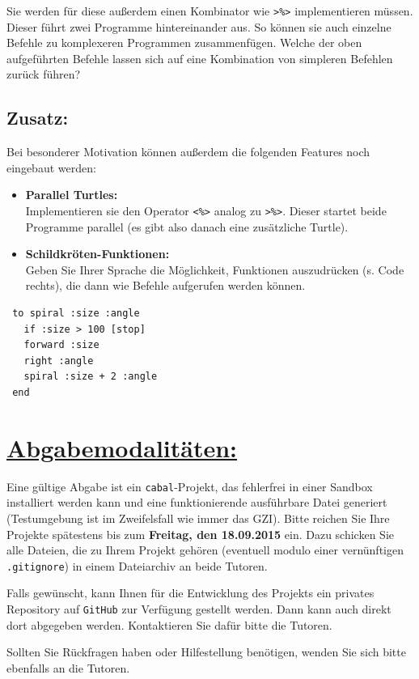 \documentclass[10pt,a4paper]{article}
\begin{document}
Sie werden für diese außerdem einen Kombinator wie \texttt{>\%>} implementieren müssen. Dieser führt zwei Programme hintereinander aus. So können sie auch einzelne Befehle zu
komplexeren Programmen zusammenfügen. Welche der oben aufgeführten Befehle lassen sich auf eine Kombination
von simpleren Befehlen zurück führen?

\subsection*{Zusatz:}

Bei besonderer Motivation können außerdem die folgenden Features noch eingebaut werden:\bigskip
 
\begin{minipage}{0.68\linewidth}
\begin{itemize}
\item \textbf{Parallel Turtles:}\\ Implementieren sie den Operator \texttt{<\%>} analog zu \texttt{>\%>}. Dieser startet beide Programme parallel (es gibt also danach eine zusätzliche Turtle).
\item \textbf{Schildkröten-Funktionen:}\\ Geben Sie Ihrer Sprache die Möglichkeit, Funktionen auszudrücken (s. Code rechts), die dann wie Befehle aufgerufen werden können.
\end{itemize}
\end{minipage}
\hfill
\begin{minipage}{0.3\linewidth}
\begin{verbatim}
 to spiral :size :angle
   if :size > 100 [stop]
   forward :size
   right :angle
   spiral :size + 2 :angle
 end
\end{verbatim}
\end{minipage}

\section*{\underline{Abgabemodalitäten:}}

Eine gültige Abgabe ist ein \texttt{cabal}-Projekt, das fehlerfrei in einer Sandbox installiert werden kann und eine funktionierende ausführbare Datei generiert (Testumgebung ist im Zweifelsfall wie immer das GZI). Bitte reichen Sie Ihre Projekte spätestens bis zum \textbf{Freitag, den 18.09.2015} ein.
Dazu schicken Sie alle Dateien, die zu Ihrem Projekt gehören (eventuell modulo einer vernünftigen \texttt{.gitignore}) in einem Dateiarchiv an beide Tutoren.\smallskip

Falls gewünscht, kann Ihnen für die Entwicklung des Projekts ein privates Repository auf \texttt{GitHub} zur Verfügung gestellt werden. Dann kann auch direkt dort abgegeben werden. Kontaktieren Sie dafür bitte die Tutoren.\smallskip

Sollten Sie Rückfragen haben oder Hilfestellung benötigen, wenden Sie sich bitte ebenfalls an die Tutoren.
\end{document}
